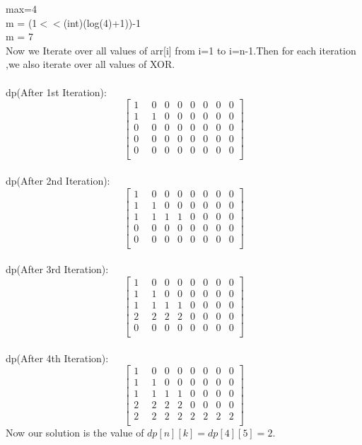 \documentclass[conference]{IEEEtran}
\begin{document}
max=4\\
m = (1$<<$(int)(log(4)+1))-1\\
m = 7\\
Now we Iterate over all values of arr[i] from i=1 to i=n-1.Then for each iteration ,we also iterate over all values of XOR.\\\\
dp(After 1st Iteration):\\
$$
\begin{bmatrix}
1 & 0 & 0 & 0 & 0 & 0 & 0 & 0\\
1 & 1 & 0 & 0 & 0 & 0 & 0 & 0\\
0 & 0 & 0 & 0 & 0 & 0 & 0 & 0\\
0 & 0 & 0 & 0 & 0 & 0 & 0 & 0\\
0 & 0 & 0 & 0 & 0 & 0 & 0 & 0\\
\quad
\end{bmatrix}
$$
\\
dp(After 2nd Iteration):\\
$$
\begin{bmatrix}
1 & 0 & 0 & 0 & 0 & 0 & 0 & 0\\
1 & 1 & 0 & 0 & 0 & 0 & 0 & 0\\
1 & 1 & 1 & 1 & 0 & 0 & 0 & 0\\
0 & 0 & 0 & 0 & 0 & 0 & 0 & 0\\
0 & 0 & 0 & 0 & 0 & 0 & 0 & 0\\
\quad
\end{bmatrix}
$$
\\
dp(After 3rd Iteration):\\
$$
\begin{bmatrix}
1 & 0 & 0 & 0 & 0 & 0 & 0 & 0\\
1 & 1 & 0 & 0 & 0 & 0 & 0 & 0\\
1 & 1 & 1 & 1 & 0 & 0 & 0 & 0\\
2 & 2 & 2 & 2 & 0 & 0 & 0 & 0\\
0 & 0 & 0 & 0 & 0 & 0 & 0 & 0\\
\quad
\end{bmatrix}
$$
\\
dp(After 4th Iteration):\\
$$
\begin{bmatrix}
1 & 0 & 0 & 0 & 0 & 0 & 0 & 0\\
1 & 1 & 0 & 0 & 0 & 0 & 0 & 0\\
1 & 1 & 1 & 1 & 0 & 0 & 0 & 0\\
2 & 2 & 2 & 2 & 0 & 0 & 0 & 0\\
2 & 2 & 2 & 2 & 2 & 2 & 2 & 2\\
\quad
\end{bmatrix}
$$
Now our solution is the value of $dp[n][k]=dp[4][5]=2$.
\end{document}
